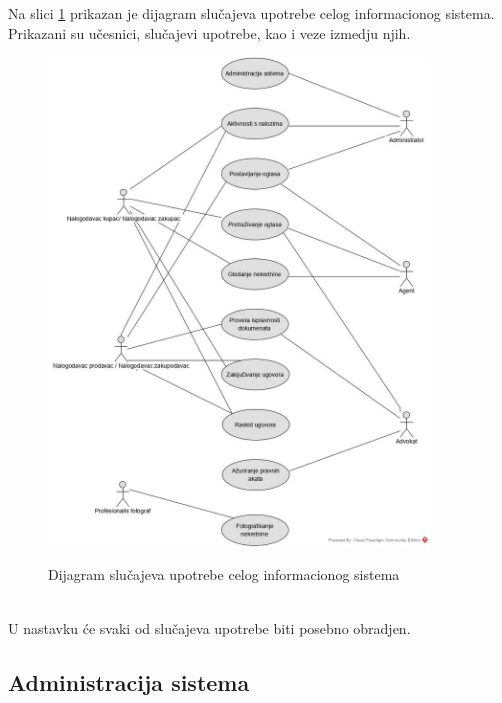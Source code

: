 \documentclass[20pt]{article}
\begin{document}
Na slici \ref{fig:dijagramSlucajevaUpotrebeCelogIS} prikazan je dijagram slu\v{c}ajeva upotrebe celog informacionog sistema. Prikazani su u\v{c}esnici, slu\v{c}ajevi upotrebe, kao i veze izme{dj}u njih.\\
\begin{figure}[h]
		\centering
		\includegraphics[width=0.9\textwidth,height=0.74\textheight]{Pictures/DijagramSlucajevaUpotrebeCelogInformacionogSistema}\\
		\caption{Dijagram slu\v{c}ajeva upotrebe celog informacionog sistema}
		\label{fig:dijagramSlucajevaUpotrebeCelogIS}
	\end{figure}\\
U nastavku \'{c}e svaki od slu\v{c}ajeva upotrebe biti posebno obra{dj}en.

\newpage
\subsection{\bfseries \Large Administracija sistema}
\setlength{\parindent}{1cm}
\fontsize{13}{18} \selectfont 
\end{document}
